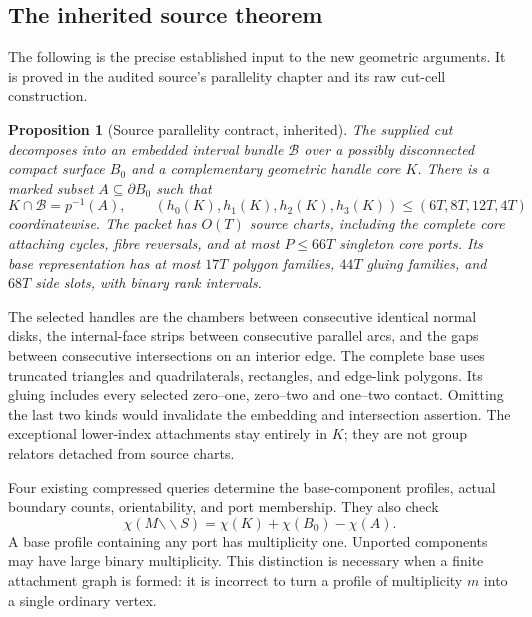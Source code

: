 \documentclass[11pt,a4paper]{article}
\newtheorem{proposition}[theorem]{Proposition}
\theoremstyle{definition}
\newcommand{\cut}{\mathbin{\backslash\!\backslash}}
\begin{document}
\subsection{The inherited source theorem}

The following is the precise established input to the new geometric arguments.
It is proved in the audited source's parallelity chapter and its raw cut-cell
construction\cite{ProveIt2026}.

\begin{proposition}[Source parallelity contract, inherited]
\label{main:source-contract}
The supplied cut decomposes into an embedded interval bundle $\mathcal B$
over a possibly disconnected compact surface $B_0$ and a complementary
geometric handle core $K$.  There is a marked subset $A\subseteq\partial B_0$
such that
\[
 K\cap\mathcal B=p^{-1}(A),\qquad
 (h_0(K),h_1(K),h_2(K),h_3(K))
       \leq(6T,8T,12T,4T)
\]
coordinatewise.  The packet has $O(T)$ source charts, including the complete
core attaching cycles, fibre reversals, and at most $P\leq66T$ singleton core
ports.  Its base representation has at most $17T$ polygon families, $44T$
gluing families, and $68T$ side slots, with binary rank intervals.
\end{proposition}

The selected handles are the chambers between consecutive identical normal
disks, the internal-face strips between consecutive parallel arcs, and the
gaps between consecutive intersections on an interior edge.  The complete
base uses truncated triangles and quadrilaterals, rectangles, and edge-link
polygons.  Its gluing includes every selected zero--one, zero--two and
one--two contact.  Omitting the last two kinds would invalidate the embedding
and intersection assertion.  The exceptional lower-index attachments stay
entirely in $K$; they are not group relators detached from source charts.

Four existing compressed queries determine the base-component profiles,
actual boundary counts, orientability, and port membership.  They also check
\begin{equation}
\label{main:euler-identity}
 \chi(M\cut S)=\chi(K)+\chi(B_0)-\chi(A).
\end{equation}
A base profile containing any port has multiplicity one.  Unported components
may have large binary multiplicity.  This distinction is necessary when a
finite attachment graph is formed: it is incorrect to turn a profile of
multiplicity $m$ into a single ordinary vertex.
\end{document}
